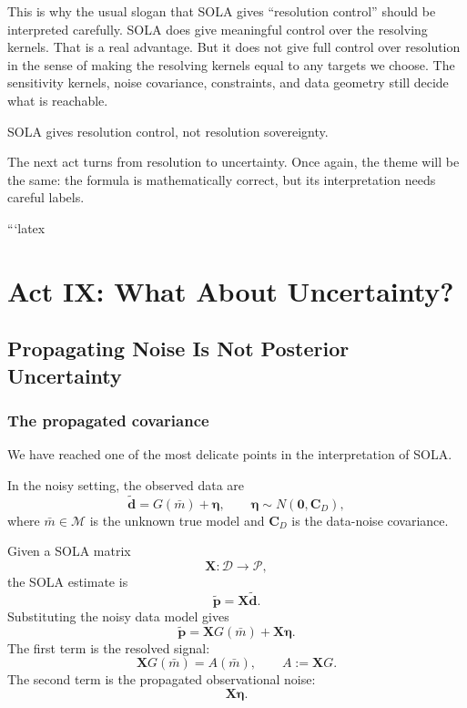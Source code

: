 \documentclass[11pt,openany]{book}
\theoremstyle{definition}
\theoremstyle{remark}
\newcommand{\M}{\mathcal M}
\newcommand{\D}{\mathcal D}
\newcommand{\Pspace}{\mathcal P}
\begin{document}
This is why the usual slogan that SOLA gives ``resolution control'' should be interpreted
carefully. SOLA does give meaningful control over the resolving kernels. That is a real advantage.
But it does not give full control over resolution in the sense of making the resolving kernels equal
to any targets we choose. The sensitivity kernels, noise covariance, constraints, and data geometry
still decide what is reachable.

\begin{lessonbox}
SOLA gives resolution control, not resolution sovereignty.
\end{lessonbox}

The next act turns from resolution to uncertainty. Once again, the theme will be the same:
the formula is mathematically correct, but its interpretation needs careful labels.

```latex

\part{Act IX: What About Uncertainty?}

\chapter{Propagating Noise Is Not Posterior Uncertainty}

\section{The propagated covariance}

We have reached one of the most delicate points in the interpretation of SOLA.

In the noisy setting, the observed data are
\[
  \widetilde{\mathbf d}
  =
  G(\bar m)+\boldsymbol\eta,
  \qquad
  \boldsymbol\eta\sim N(\mathbf 0,\mathbf C_D),
\]
where \(\bar m\in\M\) is the unknown true model and \(\mathbf C_D\) is the data-noise covariance.

Given a SOLA matrix
\[
  \mathbf X:\D\to\Pspace,
\]
the SOLA estimate is
\[
  \widetilde{\mathbf p}
  =
  \mathbf X\widetilde{\mathbf d}.
\]
Substituting the noisy data model gives
\[
  \widetilde{\mathbf p}
  =
  \mathbf XG(\bar m)
  +
  \mathbf X\boldsymbol\eta.
\]
The first term is the resolved signal:
\[
  \mathbf XG(\bar m)=A(\bar m),
  \qquad
  A:=\mathbf XG.
\]
The second term is the propagated observational noise:
\[
  \mathbf X\boldsymbol\eta.
\]
\end{document}
